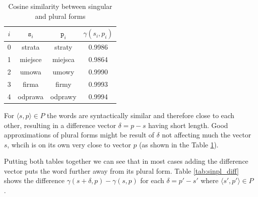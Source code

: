 \documentclass{article}
\begin{document}
  \begin{table}[ht]
  \center
  \begin{tabular}{|c|c|c|c|}
  \hline
  $i$ & $\texttt{s}_i$ & $\texttt{p}_i$ & $\gamma(s_i, p_i)$ \\ \hline
  0 & strata & straty & 0.9986 \\ \hline
  1 & miejsce & miejsca & 0.9864 \\ \hline
  2 & umowa & umowy & 0.9990 \\ \hline
  3 & firma & firmy & 0.9993 \\ \hline
  4 & odprawa & odprawy & 0.9994 \\ \hline
  \end{tabular}
  \caption{Cosine similarity between singular and plural forms}
  \label{tab:sinpl_sim_words}
  \end{table}

  For $\langle s, p \rangle \in P$ the words are syntactically similar and
  therefore close to each other, resulting in a difference vector $\delta = p - s$
  having short length. Good approximations of plural forms might be result of
  $\delta$ not affecting much the vector $s$, whcih is on its own very close to vector $p$
  (as shown in the Table \ref{tab:sinpl_sim_words}).

  Putting both tables together we can see that in most cases adding the difference
  vector puts the word further away from its plural form. Table \ref{tab:sinpl_diff}
  shows the difference $\gamma(s + \delta, p) - \gamma(s, p)$ for each $\delta = p' - s'$
  where $\langle s', p' \rangle \in P$.

  \begin{table}[ht]
  \center
  \caption{Cosine similarity between plural and generated plural forms}
  \label{tab:sinpl_diff}
  \end{table}
\end{document}
